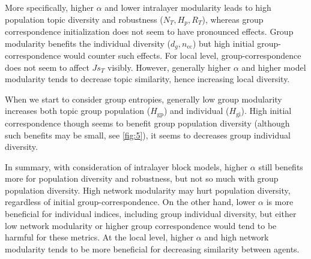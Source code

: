 More specifically, higher $\alpha$ and lower intralayer modularity leads to high population topic diversity and robustness ($N_T, H_p, R_T$), whereas group correspondence initialization does not seem to have pronounced effects. Group modularity benefits the individual diversity ($d_g, n_{\mathrm{cc}}$) but high initial group-correspondence would counter such effects. For local level, group-correspondence does not seem to affect $Js_T$ visibly. However, generally higher $\alpha$ and higher model modularity tends to decrease topic similarity, hence increasing local diversity.

When we start to consider group entropies, generally low group modularity increases both topic group population ($H_{\mathrm{gp}}$) and individual ($H_{\mathrm{gi}}$). High initial correspondence though seems to benefit group population diversity (although such benefits may be small, see \autoref{fig:5}), it seems to decreases  group individual diversity.

In summary, with consideration of intralayer block models, higher $\alpha$ still benefits more for population diversity and robustness, but not so much with group population diversity. High network modularity may hurt population diversity, regardless of initial group-correspondence. On the other hand, lower $\alpha$ is more beneficial for individual indices, including group individual diversity, but either low network modularity or higher group correspondence would tend to be harmful for these metrics. At the local level, higher $\alpha$ and high network modularity tends to be more beneficial for decreasing similarity between agents.

